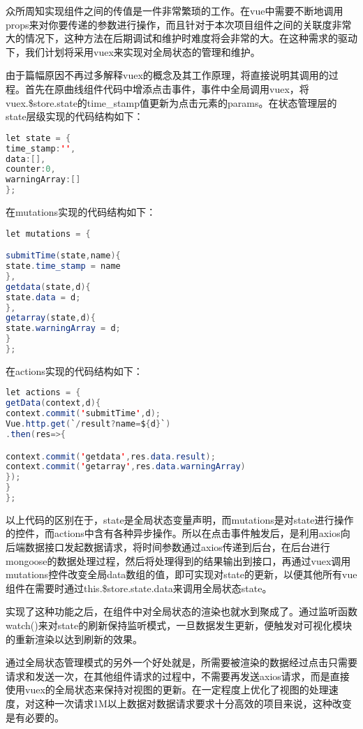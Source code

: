 众所周知实现组件之间的传值是一件非常繁琐的工作。在vue中需要不断地调用props来对你要传递的参数进行操作，而且针对于本次项目组件之间的关联度非常大的情况下，这种方法在后期调试和维护时难度将会非常的大。在这种需求的驱动下，我们计划将采用vuex来实现对全局状态的管理和维护。

由于篇幅原因不再过多解释vuex的概念及其工作原理，将直接说明其调用的过程。首先在原曲线组件代码中增添点击事件，事件中全局调用vuex，将vuex.\$store.state的time\_stamp值更新为点击元素的params。在状态管理层的state层级实现的代码结构如下：

\begin{lstlisting}[caption=state层级结构,frame=shadowbox,language={java}]
let state = {
time_stamp:'',
data:[],
counter:0,
warningArray:[]
};
\end{lstlisting}

在mutations实现的代码结构如下：

\newpage
\begin{lstlisting}[caption=mutations层级结构,frame=shadowbox,language={java}]
let mutations = {

submitTime(state,name){
state.time_stamp = name
},
getdata(state,d){
state.data = d;
},
getarray(state,d){
state.warningArray = d;
}
};
\end{lstlisting}

在actions实现的代码结构如下：

\begin{lstlisting}[caption=actions层级结构,frame=shadowbox,language={java}]
let actions = {
getData(context,d){
context.commit('submitTime',d);
Vue.http.get(`/result?name=${d}`)
.then(res=>{

context.commit('getdata',res.data.result);
context.commit('getarray',res.data.warningArray)
});
}
};
\end{lstlisting}

以上代码的区别在于，state是全局状态变量声明，而mutations是对state进行操作的控件，而actions中含有各种异步操作。所以在点击事件触发后，是利用axios向后端数据接口发起数据请求，将时间参数通过axios传递到后台，在后台进行mongoose的数据处理过程，然后将处理得到的结果输出到接口，再通过vuex调用mutations控件改变全局data数组的值，即可实现对state的更新，以便其他所有vue组件在需要时通过this.\$store.state.data来调用全局状态state。

实现了这种功能之后，在组件中对全局状态的渲染也就水到聚成了。通过监听函数watch()来对state的刷新保持监听模式，一旦数据发生更新，便触发对可视化模块的重新渲染以达到刷新的效果。

通过全局状态管理模式的另外一个好处就是，所需要被渲染的数据经过点击只需要请求和发送一次，在其他组件请求的过程中，不需要再发送axios请求，而是直接使用vuex的全局状态来保持对视图的更新。在一定程度上优化了视图的处理速度，对这种一次请求1M以上数据对数据请求要求十分高效的项目来说，这种改变是有必要的。


